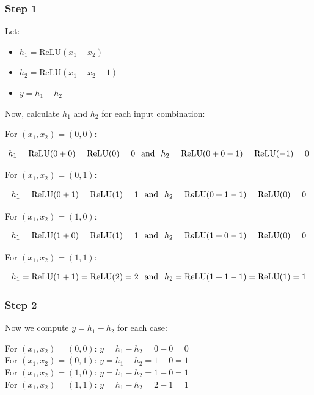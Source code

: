 \documentclass{article}
\begin{document}
\subsubsection*{Step 1}
\parbox{\textwidth}{

Let:
\begin{itemize}
    \item $h_{1}=\text{ReLU}(x_{1}+x_{2})$
    \item $h_{2}=\text{ReLU}(x_{1}+x_{2}-1)$
    \item $y=h_{1}-h_{2}$
\end{itemize}

Now, calculate $h_1$ and $h_2$ for each input combination:

For $(x_1, x_2) = (0, 0)$:

$$h_1 = \text{ReLU}(0 + 0) = \text{ReLU}(0) = 0 \hspace{0.25cm} \text{and} \hspace{0.25cm} h_2 = \text{ReLU}(0 + 0 - 1) = \text{ReLU}(-1) = 0$$

For $(x_1, x_2) = (0, 1)$:

$$h_1 = \text{ReLU}(0 + 1) = \text{ReLU}(1) = 1 \hspace{0.25cm} \text{and} \hspace{0.25cm} h_2 = \text{ReLU}(0 + 1 - 1) = \text{ReLU}(0) = 0$$

For $(x_1, x_2) = (1, 0)$:

$$h_1 = \text{ReLU}(1 + 0) = \text{ReLU}(1) = 1 \hspace{0.25cm} \text{and} \hspace{0.25cm} h_2 = \text{ReLU}(1 + 0 - 1) = \text{ReLU}(0) = 0$$


For $(x_1, x_2) = (1, 1)$:

$$h_1 = \text{ReLU}(1 + 1) = \text{ReLU}(2) = 2 \hspace{0.25cm} \text{and} \hspace{0.25cm} h_2 = \text{ReLU}(1 + 1 - 1) = \text{ReLU}(1) = 1$$

}

\subsubsection*{Step 2}
\parbox{\textwidth}{
Now we compute $y = h_1 - h_2$ for each case:

For $(x_1, x_2) = (0, 0)$: $y = h_1 - h_2 = 0 - 0 = 0$\\

For $(x_1, x_2) = (0, 1)$: $y = h_1 - h_2 = 1 - 0 = 1$\\

For $(x_1, x_2) = (1, 0)$: $y = h_1 - h_2 = 1 - 0 = 1$\\

For $(x_1, x_2) = (1, 1)$: $y = h_1 - h_2 = 2 - 1 = 1$

}
\end{document}
